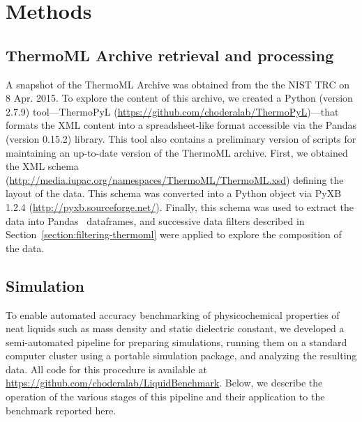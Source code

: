 \documentclass[aip, jcp, reprint]{revtex4-1}  %
\begin{document}

\section{Methods}
\label{section:methods}

\subsection{ThermoML Archive retrieval and processing}
\label{section:thermoml-archive-retrieval}


A snapshot of the ThermoML Archive was obtained from the the NIST TRC on 8 Apr. 2015.
To explore the content of this archive, we created a Python (version 2.7.9) tool---ThermoPyL (\url{https://github.com/choderalab/ThermoPyL})---that formats the XML content into a spreadsheet-like format accessible via the Pandas (version 0.15.2) library.
This tool also contains a preliminary version of scripts for maintaining an up-to-date version of the ThermoML archive.
First, we obtained the XML schema (\url{http://media.iupac.org/namespaces/ThermoML/ThermoML.xsd}) defining the layout of the data.
This schema was converted into a Python object via PyXB 1.2.4 (\url{http://pyxb.sourceforge.net/}).
Finally, this schema was used to extract the data into Pandas~\cite{pandas} dataframes, and successive data filters described in Section~\ref{section:filtering-thermoml} were applied to explore the composition of the data.

\subsection{Simulation}
\label{section:simulation}

To enable automated accuracy benchmarking of physicochemical properties of neat liquids such as mass density and static dielectric constant, we developed a semi-automated pipeline for preparing simulations, running them on a standard computer cluster using a portable simulation package, and analyzing the resulting data.
All code for this procedure is available at  \url{https://github.com/choderalab/LiquidBenchmark}.
Below, we describe the operation of the various stages of this pipeline and their application to the benchmark reported here.
\end{document}
